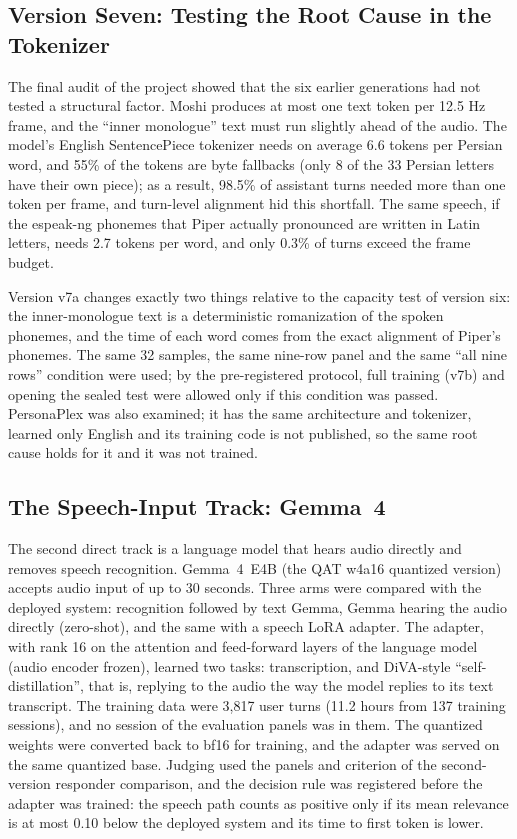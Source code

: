 \subsection{Version Seven: Testing the Root Cause in the Tokenizer}
\label{sec:moshi-v7}

The final audit of the project showed that the six earlier generations had not tested a
structural factor. Moshi produces at most one text token per 12.5 Hz frame, and the
``inner monologue'' text must run slightly ahead of the audio. The model's English
SentencePiece tokenizer needs on average 6.6 tokens per Persian word, and 55\% of the
tokens are byte fallbacks (only 8 of the 33 Persian letters have their own piece); as a
result, 98.5\% of assistant turns needed more than one token per frame, and turn-level
alignment hid this shortfall. The same speech, if the espeak-ng phonemes that Piper
actually pronounced are written in Latin letters, needs 2.7 tokens per word, and only
0.3\% of turns exceed the frame budget.

Version v7a changes exactly two things relative to the capacity test of version six: the
inner-monologue text is a deterministic romanization of the spoken phonemes, and the time
of each word comes from the exact alignment of Piper's phonemes. The same 32 samples, the
same nine-row panel and the same ``all nine rows'' condition were used; by the
pre-registered protocol, full training (v7b) and opening the sealed test were allowed only
if this condition was passed. PersonaPlex was also examined; it has the same architecture
and tokenizer, learned only English and its training code is not published, so the same
root cause holds for it and it was not trained.

\subsection{The Speech-Input Track: Gemma~4}
\label{sec:speechin}

The second direct track is a language model that hears audio directly and removes speech
recognition. Gemma~4~E4B (the QAT w4a16 quantized version) accepts audio input of up to
30 seconds. Three arms were compared with the deployed system: recognition followed by
text Gemma, Gemma hearing the audio directly (zero-shot), and the same with a speech LoRA
adapter. The adapter, with rank 16 on the attention and feed-forward layers of the
language model (audio encoder frozen), learned two tasks: transcription, and DiVA-style
``self-distillation'', that is, replying to the audio the way the model replies to its
text transcript. The training data were 3,817 user turns (11.2 hours from 137 training
sessions), and no session of the evaluation panels was in them. The quantized weights
were converted back to bf16 for training, and the adapter was served on the same
quantized base. Judging used the panels and criterion of the second-version responder
comparison, and the decision rule was registered before the adapter was trained: the
speech path counts as positive only if its mean relevance is at most 0.10 below the
deployed system and its time to first token is lower.

